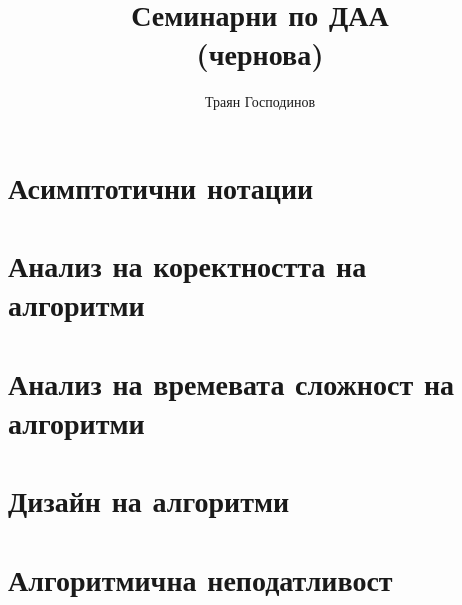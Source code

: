 \documentclass[a4paper,12pt,oneside]{book}%
\title{Семинарни по ДАА\\\large (чернова)}
\author{Траян Господинов}
\begin{document}
 
	
	\maketitle
	
	\tableofcontents
	
	\chapter{Асимптотични нотации}
	
	
	\chapter{Анализ на коректността на алгоритми}
	
	
	\chapter{Анализ на времевата сложност на алгоритми}
	

	\chapter{Дизайн на алгоритми}
	

	\chapter{Алгоритмична неподатливост}
	

\end{document}
